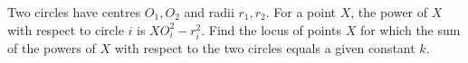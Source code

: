 Two circles have centres $O_1,O_2$ and radii $r_1,r_2$. For a point $X$, the power of $X$ with respect to circle $i$ is $XO_i^2-r_i^2$. Find the locus of points $X$ for which the sum of the powers of $X$ with respect to the two circles equals a given constant $k$.

